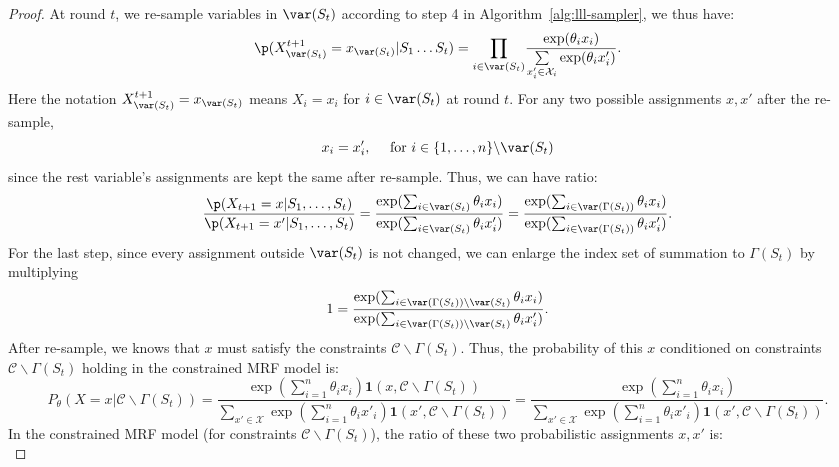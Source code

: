 \begin{lemma}
\begin{proof}
At round $t$,  we re-sample variables in $\var(S_t)$ according to step 4 in Algorithm~\ref{alg:lll-sampler}, we thus have:
\begin{equation*}
\p(X^{t+1}_{\var(S_t)}=x_{\var(S_t)}|S_1 \ldots S_t)=\underset{{i\in\var(S_t)}}{\prod}\frac{\exp(\theta_i x_i)}{\underset{x'_i\in \mathcal{X}_i}{\sum}\exp(\theta_ix'_i)}.
\end{equation*}
Here the notation $X^{t+1}_{\var(S_t)}=x_{\var(S_t)}$ means $X_i=x_i$ for $i\in\var(S_t)$ at round $t$. For any two possible assignments $x,x'$ after the re-sample,
\begin{equation*}
x_i=x'_i,\quad \text{ for }i\in \{1,\ldots,n\}\backslash \var(S_t)
\end{equation*}
since the rest variable's assignments are kept the same after re-sample. Thus, we can have ratio:
\begin{equation}\label{eq:ratio-nelson}
\frac{\p(X_{t+1}=x|S_1,\ldots,S_t)}{\p(X_{t+1}=x'|S_1,\ldots, S_t)}=\frac{\exp(\sum_{i\in\var(S_t)}\theta_ix_i)}{\exp(\sum_{i\in\var(S_t)}\theta_ix'_i)} =\frac{\exp(\sum_{i\in\var(\Gamma(S_t))}\theta_ix_i)}{\exp(\sum_{i\in\var(\Gamma(S_t))}\theta_ix'_i)}.
\end{equation}
For the last step, since every assignment outside $\var(S_t)$ is not changed, we can enlarge the index set of summation to $\Gamma(S_t)$ by multiplying
\begin{align*}
1 = \frac{\exp(\sum_{i\in\var(\Gamma(S_t)) \backslash \var(S_t)}\theta_ix_i)}{\exp(\sum_{i\in\var(\Gamma(S_t))\backslash \var(S_t)}\theta_ix'_i)}.
\end{align*}
After re-sample, we knows that $x$ must satisfy the constraints $\mathcal{C}\backslash\Gamma(S_t)$. Thus, the probability of this $x$ conditioned on constraints $\mathcal{C}\backslash\Gamma(S_t)$ holding in the constrained MRF model is:
\begin{equation*}
P_{\theta}(X=x|\mathcal{C} \backslash \Gamma(S_t))
=\frac{\exp(\sum_{i=1}^n\theta_i x_i)\mathbf{1}(x,\mathcal{C}\backslash \Gamma(S_t))}{\sum_{x'\in\mathcal{X}} \exp(\sum_{i=1}^n\theta_i x'_i)\mathbf{1}\left(x',\mathcal{C}\backslash \Gamma(S_t)\right)}=\frac{\exp(\sum_{i=1}^n\theta_i x_i)}{\sum_{x'\in\mathcal{X}} \exp(\sum_{i=1}^n\theta_i x'_i)\mathbf{1}\left(x',\mathcal{C}\backslash \Gamma(S_t)\right)}.
\end{equation*}
In the constrained MRF model (for constraints  $\mathcal{C}\backslash\Gamma(S_t)$), the ratio of these two probabilistic assignments $x,x'$ is:
\begin{equation}\label{eq:ratio-cmrf}

\end{equation}
\end{proof}
\end{lemma}
